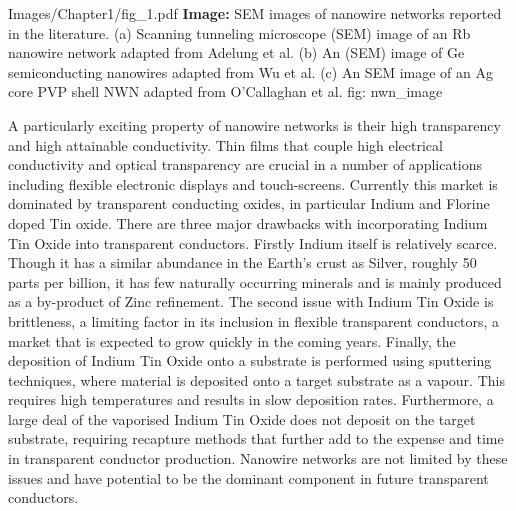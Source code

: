 {Images/Chapter1/fig_1.pdf}
{\textbf{Image:} SEM images of nanowire networks reported in the literature.}
{(a) Scanning tunneling microscope (SEM) image of an Rb nanowire network adapted from Adelung et al\cite{adelung1999}. (b) An (SEM) image of Ge semiconducting nanowires adapted from Wu et al\cite{wu2002}. (c) An SEM image of an Ag core PVP shell NWN adapted from O'Callaghan et al\cite{ocallaco2016}.}
{fig: nwn_image}

A particularly exciting property of nanowire networks is their high transparency and high attainable conductivity\cite{langley2014,song2013}. Thin films that couple high electrical conductivity and optical transparency are crucial in a number of applications including flexible electronic displays and touch-screens. Currently this market is dominated by transparent conducting oxides, in particular Indium and Florine doped Tin oxide\cite{kumar2010}. There are three major drawbacks with incorporating Indium Tin Oxide into transparent conductors. Firstly Indium itself is relatively scarce. Though it has a similar abundance in the Earth's crust as Silver, roughly 50 parts per billion, it has few naturally occurring minerals and is mainly produced as a by-product of Zinc refinement\cite{phipps2008}. The second issue with Indium Tin Oxide is brittleness\cite{chen2001}, a limiting factor in its inclusion in flexible transparent conductors, a market that is expected to grow quickly in the coming years. Finally, the deposition of Indium Tin Oxide onto a substrate is performed using sputtering techniques\cite{meng1998}, where material is deposited onto a target substrate as a vapour. This requires high temperatures and results in slow deposition rates\cite{meng1998}. Furthermore, a large deal of the vaporised Indium Tin Oxide does not deposit on the target substrate, requiring recapture methods that further add to the expense and time in transparent conductor production\cite{stewart2014}. Nanowire networks are not limited by these issues and have potential to be the dominant component in future transparent conductors.

